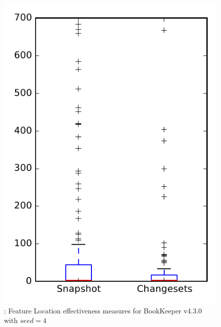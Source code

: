 
\begin{figure}
\centering
\includegraphics[height=0.4\textheight]{figures/flt_seed/rq1_bookkeeper_4}
\caption{\rone: Feature Location effectiveness measures for BookKeeper v4.3.0 with $seed=4$}
\label{fig:flt_seed:rq1:bookkeeper}
\end{figure}
